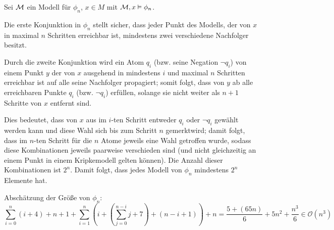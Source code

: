 
Sei $\mathcal{M}$ ein Modell für $\phi_n$, $x\in M$ mit $\mathcal{M}, x \vDash
\phi_n$.

Die erste Konjunktion in $\phi_n$ stellt sicher, dass jeder Punkt des
Modells, der von $x$ in maximal $n$ Schritten erreichbar ist, mindestens zwei
verschiedene Nachfolger besitzt.

Durch die zweite Konjunktion wird ein Atom $q_i$ (bzw. seine Negation $\neg q_i$)
von einem Punkt $y$ der von $x$ ausgehend in mindestens $i$ und maximal $n$
Schritten erreichbar ist auf alle seine Nachfolger propagiert; somit folgt,
dass von $y$ ab alle erreichbaren Punkte $q_i$ (bzw. $\neg q_i$) erfüllen,
solange sie nicht weiter als $n+1$ Schritte von $x$ entfernt sind.

Dies bedeutet, dass von $x$ aus im $i$-ten Schritt entweder $q_i$ oder $\neg
q_i$ gewählt werden kann und diese Wahl sich bis zum Schritt $n$ \glqq
gemerkt\grqq wird; damit folgt, dass im $n$-ten Schritt für die $n$ Atome
jeweils eine Wahl getroffen wurde, sodass diese Kombinationen jeweils paarweise
verschieden sind (und nicht gleichzeitig an einem Punkt in einem Kripkemodell
gelten können). Die Anzahl dieser Kombinationen ist $2^n$. Damit folgt, dass
jedes Modell von $\phi_n$ mindestens $2^n$ Elemente hat.

Abschätzung der Größe von $\phi_n$:
\[
\sum_{i=0}^{n}(i + 4) + n + 1 + \sum_{i=1}^{n}\left(i + \left(\sum_{j=0}^{n-i}
j + 7\right) + (n - i + 1) \right) + n = \frac{5+(65 n)}{6}+5 n^2+\frac{n^3}{6}
\in \mathcal{O}(n^3)
\]


